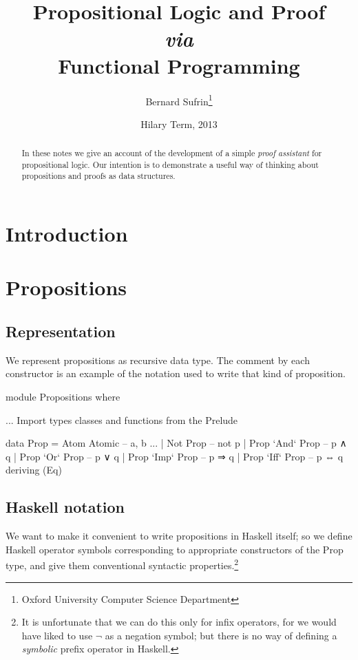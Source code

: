 \documentclass[11pt]{article}
\title{Propositional Logic and Proof \\\textit{via}\\ Functional Programming}
\author{Bernard Sufrin\thanks{Oxford University Computer Science Department}}
\date{Hilary Term, 2013}
\begin{document}
\maketitle
\begin{abstract}
\noindent In these notes we give an account of the
development of a simple \textit{proof assistant} for
propositional logic. Our intention is to demonstrate a useful way of
thinking about propositions and proofs as data structures.
\end{abstract}

\tableofcontents

\newpage
\section{Introduction}

\section{Propositions}

\subsection{Representation}
We represent propositions as recursive data type. The
comment by each constructor is an example of the notation
used to write that kind of proposition.

\begin{code}[frame=single,label=Haskell]
module Propositions where
  
  ... Import types classes and functions from the Prelude

  data Prop = Atom Atomic         -- a, b ...
            | Not  Prop           -- not p
            | Prop `And` Prop     -- p ∧ q
            | Prop `Or`  Prop     -- p ∨ q
            | Prop `Imp` Prop     -- p ⇒ q
            | Prop `Iff` Prop     -- p ⇔ q
            deriving (Eq)
\end{code}

\subsection{Haskell notation}
We want to make it convenient to write propositions in Haskell itself; so we 
define Haskell operator symbols corresponding to appropriate
constructors of the \textsf{Prop} type, and give them conventional
syntactic properties.\footnote{It is unfortunate that
we can do this only for infix operators, for we would
have liked to use $\lnot$ as a negation symbol; but there is
no way of defining a \textit{symbolic} prefix operator in Haskell.} 
\end{document}
